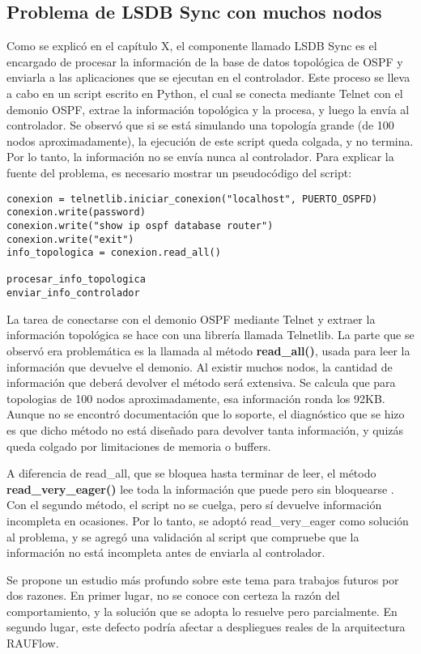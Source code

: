 \subsection{Problema de LSDB Sync con muchos nodos}
Como se explicó en el capítulo X, el componente llamado LSDB Sync es el encargado de procesar la información de la base de datos topológica de OSPF y enviarla a las aplicaciones que se ejecutan en el controlador. Este proceso se lleva a cabo en un script escrito en Python, el cual se conecta mediante Telnet con el demonio OSPF, extrae la información topológica y la procesa, y luego la envía al controlador. Se observó que si se está simulando una topología grande (de 100 nodos aproximadamente), la ejecución de este script queda colgada, y no termina. Por lo tanto, la información no se envía nunca al controlador. Para explicar la fuente del problema, es necesario mostrar un pseudocódigo del script:
\begin{lstlisting}
conexion = telnetlib.iniciar_conexion("localhost", PUERTO_OSPFD)
conexion.write(password)
conexion.write("show ip ospf database router")
conexion.write("exit")
info_topologica = conexion.read_all()

procesar_info_topologica
enviar_info_controlador
\end{lstlisting}
La tarea de conectarse con el demonio OSPF mediante Telnet y extraer la información topológica se hace con una librería llamada Telnetlib. La parte que se observó era problemática es la llamada al método \textbf{read\_all()}, usada para leer la información que devuelve el demonio. Al existir muchos nodos, la cantidad de información que deberá devolver el método será extensiva. Se calcula que para topologias de 100 nodos aproximadamente, esa información ronda los 92KB. Aunque no se encontró documentación que lo soporte, el diagnóstico que se hizo es que dicho método no está diseñado para devolver tanta información, y quizás queda colgado por limitaciones de memoria o buffers.

A diferencia de read\_all, que se bloquea hasta terminar de leer, el método \textbf{read\_very\_eager()} lee toda la información que puede pero sin bloquearse \cite{doc-telnetlib}. Con el segundo método, el script no se cuelga, pero sí devuelve información incompleta en ocasiones. Por lo tanto, se adoptó read\_very\_eager como solución al problema, y se agregó una validación al script que compruebe que la información no está incompleta antes de enviarla al controlador.

Se propone un estudio más profundo sobre este tema para trabajos futuros por dos razones. En primer lugar, no se conoce con certeza la razón del comportamiento, y la solución que se adopta lo resuelve pero parcialmente. En segundo lugar, este defecto podría afectar a despliegues reales de la arquitectura RAUFlow.

